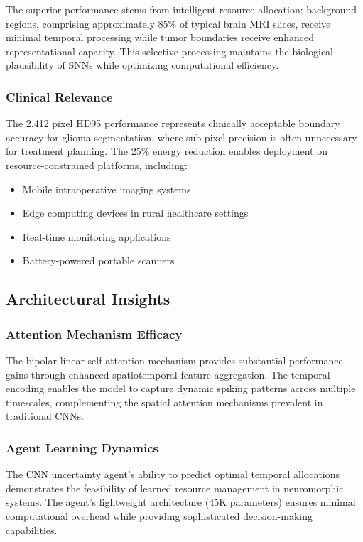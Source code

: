 \documentclass[12pt,a4paper]{article}
\begin{document}
The superior performance stems from intelligent resource allocation: background regions, comprising approximately 85\% of typical brain MRI slices, receive minimal temporal processing while tumor boundaries receive enhanced representational capacity. This selective processing maintains the biological plausibility of SNNs while optimizing computational efficiency.

\subsubsection{Clinical Relevance}

The 2.412 pixel HD95 performance represents clinically acceptable boundary accuracy for glioma segmentation, where sub-pixel precision is often unnecessary for treatment planning. The 25\% energy reduction enables deployment on resource-constrained platforms, including:
\begin{itemize}
\item Mobile intraoperative imaging systems
\item Edge computing devices in rural healthcare settings
\item Real-time monitoring applications
\item Battery-powered portable scanners
\end{itemize}

\subsection{Architectural Insights}

\subsubsection{Attention Mechanism Efficacy}

The bipolar linear self-attention mechanism provides substantial performance gains through enhanced spatiotemporal feature aggregation. The temporal encoding enables the model to capture dynamic spiking patterns across multiple timescales, complementing the spatial attention mechanisms prevalent in traditional CNNs.

\subsubsection{Agent Learning Dynamics}

The CNN uncertainty agent's ability to predict optimal temporal allocations demonstrates the feasibility of learned resource management in neuromorphic systems. The agent's lightweight architecture (45K parameters) ensures minimal computational overhead while providing sophisticated decision-making capabilities.
\end{document}
